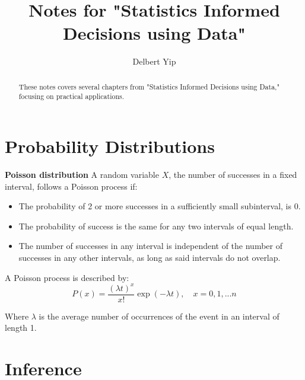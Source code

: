 \documentclass[]{article}
\title{Notes for "Statistics Informed Decisions using Data"}
\author{Delbert Yip}
\begin{document}
\maketitle

\begin{abstract}
	These notes covers several chapters from "Statistics Informed Decisions using Data," focusing on practical applications. 
\end{abstract}

\section{Probability Distributions}
\textbf{Poisson distribution}
A random variable $X$, the number of successes in a fixed interval, follows a Poisson process if:
\begin{itemize}
	\item The probability of 2 or more successes in a sufficiently small subinterval, is 0.
	\item The probability of success is the same for any two intervals of equal length. 
	\item The number of successes in any interval is independent of the number of successes in any other intervals, as long as said intervals do not overlap. 
\end{itemize}

A Poisson process is described by:
\begin{equation}
P(x) = \frac{(\lambda t)^x}{x!} \exp(-\lambda t), \quad x=0,1,...n
\end{equation}

Where $\lambda$ is the average number of occurrences of the event in an interval of length 1. 

\section{Inference}
\end{document}
